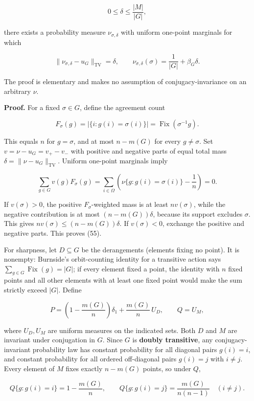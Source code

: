 \documentclass[
  11pt,
]{article}
\begin{document}
\[
0\le\delta\le \frac{|M|}{|G|}, \tag{56}
\]

there exists a probability measure \(\nu_{\sigma,\delta}\) with uniform
one-point marginals for which

\[
\|\nu_{\sigma,\delta}-u_G\|_{\mathrm{TV}}=\delta,\qquad
\nu_{\sigma,\delta}(\sigma)=\frac1{|G|}+\beta_G\delta. \tag{57}
\]

The proof is elementary and makes no assumption of conjugacy-invariance
on an arbitrary \(\nu\).

\textbf{Proof.} For a fixed \(\sigma\in G\), define the agreement count

\[
F_\sigma(g)=|\{i:g(i)=\sigma(i)\}|=\operatorname{Fix}(\sigma^{-1}g).
\]

This equals \(n\) for \(g=\sigma\), and at most \(n-m(G)\) for every
\(g\ne\sigma\). Set \(v=\nu-u_G=v_+-v_-\) with positive and negative
parts of equal total mass \(\delta=\|\nu-u_G\|_{\mathrm{TV}}\). Uniform
one-point marginals imply

\[
\sum_{g\in G}v(g)F_\sigma(g)
=\sum_{i\in\Omega}
\left(\nu\{g:g(i)=\sigma(i)\}-\frac1n\right)=0.
\]

If \(v(\sigma)>0\), the positive \(F_\sigma\)-weighted mass is at least
\(nv(\sigma)\), while the negative contribution is at most
\((n-m(G))\delta\), because its support excludes \(\sigma\). This gives
\(nv(\sigma)\le(n-m(G))\delta\). If \(v(\sigma)<0\), exchange the
positive and negative parts. This proves (55).

For sharpness, let \(D\subseteq G\) be the derangements (elements fixing
no point). It is nonempty: Burnside's orbit-counting identity for a
transitive action says \(\sum_{g\in G}\operatorname{Fix}(g)=|G|\); if
every element fixed a point, the identity with \(n\) fixed points and
all other elements with at least one fixed point would make the sum
strictly exceed \(|G|\). Define

\[
P=\left(1-\frac{m(G)}n\right)\delta_1+
\frac{m(G)}n\,U_D,\qquad Q=U_M, \tag{58}
\]

where \(U_D,U_M\) are uniform measures on the indicated sets. Both \(D\)
and \(M\) are invariant under conjugation in \(G\). Since \(G\) is
\textbf{doubly transitive}, any conjugacy-invariant probability law has
constant probability for all diagonal pairs \(g(i)=i\), and constant
probability for all ordered off-diagonal pairs \(g(i)=j\) with
\(i\ne j\). Every element of \(M\) fixes exactly \(n-m(G)\) points, so
under \(Q\),

\[
Q\{g:g(i)=i\}=1-\frac{m(G)}n,\qquad
Q\{g:g(i)=j\}=\frac{m(G)}{n(n-1)}\quad(i\ne j).
\]
\end{document}
